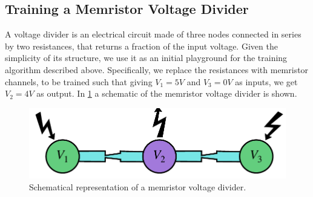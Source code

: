 \documentclass[reprint,superscriptaddress,prb,showkeys]{revtex4-2}
\begin{document}
\subsection{\label{sec:train_memr_vd}Training a Memristor Voltage Divider}
A voltage divider is an electrical circuit made of three nodes connected in series by two resistances, that returns a fraction of the input voltage. Given the simplicity of its structure, we use it as an initial playground for the training algorithm described above. Specifically, we replace the resistances with memristor channels, to be trained such that giving $V_1 = 5V$ and $V_3 = 0V$ as inputs, we get $V_2 = 4V$ as output. In \cref{fig:vd_scheme} a schematic of the memristor voltage divider is shown.
\begin{figure}[t]
    \centering
    \includegraphics[width=0.5\columnwidth]{plots/voltage_divider/vd_scheme.pdf}
    \caption{Schematical representation of a memristor voltage divider.}\label{fig:vd_scheme}
\end{figure} 
\end{document}
